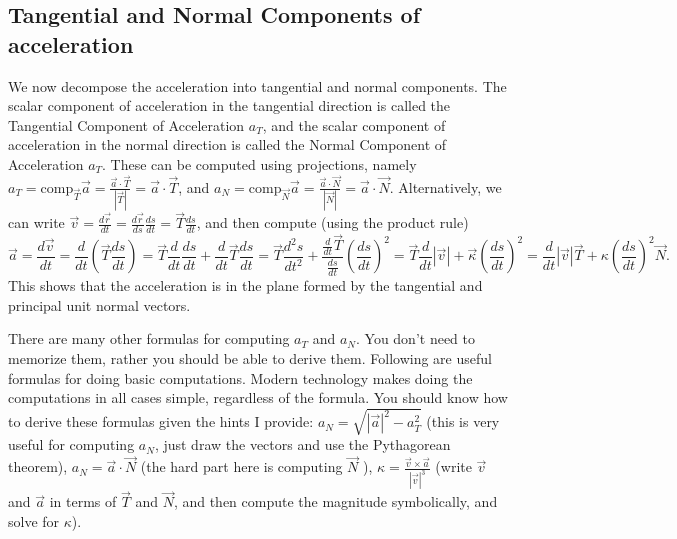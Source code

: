 \subsection{Tangential and Normal Components of acceleration}
We now decompose the acceleration into tangential and normal
components. The scalar component of acceleration in the tangential
direction is called the Tangential Component of Acceleration $a_T$,
and the scalar component of acceleration in the normal direction is
called the Normal Component of Acceleration $a_T$. These can be
computed using projections, namely {$ a_T=\text{comp}_{\vec T}\vec a 
= \frac{\vec a \cdot \vec T}{|\vec T|} = \vec a \cdot \vec T $}, and {$
a_N=\text{comp}_{\vec N}\vec a  = \frac{\vec a \cdot \vec N}{|\vec N|} =
\vec a \cdot \vec N $}.
Alternatively, we can write {$ \vec v = \frac{d\vec r}{dt} =
\frac{d\vec r}{ds}\frac{ds}{dt} = \vec T \frac{ds}{dt} $}, and then
compute (using the product rule)
$$ \vec a = \frac{d\vec v}{dt} = \frac{d}{dt}\left( \vec T
\frac{ds}{dt} \right) = \vec T  \frac{d}{dt}\frac{ds}{dt} +
\frac{d}{dt}\vec T  \frac{ds}{dt} = \vec T  \frac{d^2 s}{dt^2} +
\frac{\frac{d}{dt}\vec T}{\frac{ds}{dt}}  \left(\frac{ds}{dt}\right)^2
= \vec T  \frac{d}{dt}|\vec v| + \vec \kappa  \left(\frac{ds}{dt}\right)^2
=   \frac{d}{dt}|\vec v| \vec T + \kappa   \left(\frac{ds}{dt}\right)^2
\vec N.$$
This shows that the acceleration is in the plane formed by the
tangential and principal unit normal vectors. 

There are many other formulas for computing $a_T$ and $a_N$. You don't
need to memorize them, rather you should be able to derive them.
Following are useful formulas for doing basic computations.  Modern
technology makes doing the computations in all cases simple,
regardless of the formula.  You should know how to derive these
formulas given the hints I provide: {$ a_N =\sqrt{ |\vec a|^2-a_T^2} 
$} (this is very useful for computing {$ a_N $}, just draw the vectors
and use the Pythagorean theorem), {$ a_N = \vec a \cdot \vec N $} (the
hard part here is computing {$ \vec N $} ), {$ \kappa = \frac{\vec v \times \vec
a}{|\vec v|^3} $} (write {$ \vec v $} and {$ \vec a $} in terms of {$
\vec T $} and {$ \vec N $}, and then compute the magnitude
symbolically, and solve for {$ \kappa $}).

